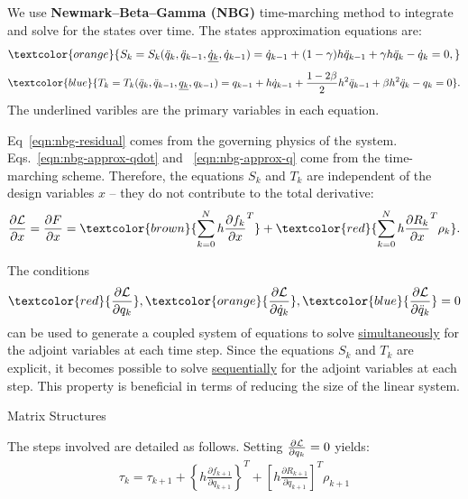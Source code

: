 \documentclass{beamer}
\newcommand{\pd}[2]{\frac{\partial #1}{\partial #2}}
\newenvironment{noheadline}{
    \setbeamertemplate{headline}{}
    \addtobeamertemplate{frametitle}{\vspace*{-1.5\baselineskip}}{}
}{}
\begin{document}
\begin{noheadline}
\begin{frame}[allowframebreaks]
{We use \textbf{Newmark--Beta--Gamma (NBG)} time-marching method to
integrate and solve for the states over time.  The states
approximation equations are:
    \begin{equation}\label{eqn:nbg-approx-qdot}
      \textcolor{orange}{S_k = S_k(\ddot{q}_{k}, \ddot{q}_{k-1}, \underline{\dot{q}_k}, \dot{q}_{k-1}) =  \dot{q}_{k-1}  + (1-\gamma) h \ddot{q}_{k-1} +  \gamma h \ddot{q}_{k}- \dot{q}_k=0, }
    \end{equation}
    \begin{equation}\label{eqn:nbg-approx-q}
      \textcolor{blue}{T_k = T_k(\ddot{q}_{k}, \ddot{q}_{k-1}, \underline{{q}_k}, {q}_{k-1}) = {q}_{k-1} + h \dot{q}_{k-1} +\frac{1-2\beta}{2}
      h^2\ddot{q}_{k-1} + \beta h^2 \ddot{q}_k-{q}_k=0}. 
    \end{equation}
    The underlined varibles are the primary variables in each equation.

    Eq~\eqref{eqn:nbg-residual} comes from the governing physics of
    the system. Eqs.~\eqref{eqn:nbg-approx-qdot} and
    ~\eqref{eqn:nbg-approx-q} come from the time-marching
    scheme. Therefore, the equations $S_k$ and $T_k$ are independent
    of the design variables $x$ -- they do not contribute to the total
    derivative:
    \begin{equation}\label{eqn:nbg-total-derivative}
      \pd{\cal{L}}{x} = \pd{F}{x} = \textcolor{brown}{\sum_{k=0}^N h \pd{f_k}{x}^T} +\textcolor{red}{ \sum_{k=0}^N h
    \pd{R_k}{x}^T \rho_k}.
    \end{equation}

    The conditions $$\textcolor{red}{\pd{\cal{L}}{{q}_k}}, \textcolor{orange}{\pd{\cal{L}}{\dot{q}_k}},
    \textcolor{blue}{\pd{\cal{L}}{\ddot{q}_k}} = 0$$ can be used to generate a coupled
    system of equations to solve \underline{simultaneously} for the
    adjoint variables at each time step. Since the equations $S_k$ and
    $T_k$ are explicit, it becomes possible to solve
    \underline{sequentially} for the adjoint variables at each step. This property
    is beneficial in terms of reducing the size of the linear system.

    \begin{block}{Matrix Structures}

    \end{block}

    
    The steps involved are detailed as follows.
         Setting $\pd{\cal{L}}{{q}_k} = 0$ yields:
         \begin{equation}
           \begin{split}
             \tau_k = \tau_{k+1} + \left\{h \pd{f_{k+1}}{{q}_{k+1}} \right\}^T + \left[ h \pd{R_{k+1}}{{q}_{k+1}} \right]^T \rho_{k+1}  
           \end{split}
         \end{equation}

}
\end{frame}
\end{noheadline}
\end{document}
